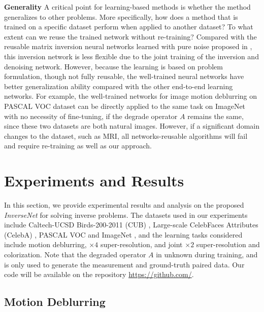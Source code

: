 \documentclass[10pt,twocolumn,letterpaper]{article}
\begin{document}

\textbf{Generality}
A critical point for learning-based methods is whether the method generalizes to other problems. 
More specifically, how does a method that is trained on a specific dataset perform when applied to another dataset? 
To what extent can we reuse the trained network without re-training? Compared with the reusable matrix inversion neural networks learned with pure noise proposed in \cite{sonderby2016amortised, ADMM2017NIPS}, this inversion network is less flexible due to the joint training of the inversion and denoising network. However, because the learning is based on problem formulation, though not fully reusable, the well-trained neural networks have better generalization ability compared with the other end-to-end learning networks.  
For example, the well-trained networks for image motion deblurring on PASCAL VOC dataset \cite{everingham2010pascal} 
can be directly applied to the same task on ImageNet \cite{deng2009imagenet} with no necessity of fine-tuning, if the degrade operator $A$ remains the same, since these two datasets are both natural images. However, if a significant domain changes to the dataset, such as MRI, all networks-reusable algorithms will fail and require re-training as well as our approach. 

\section{Experiments and Results}

In this section, we provide experimental results and analysis on the proposed \emph{InverseNet} for solving inverse problems. 
The datasets used in our experiments include Caltech-UCSD Birds-200-2011 (CUB) \cite{wah2011caltech},
Large-scale CelebFaces Attributes (CelebA) \cite{liu2015deep}, PASCAL VOC and ImageNet \cite{krizhevsky2012imagenet},
and the learning tasks considered include motion deblurring, $\times4$ super-resolution, and joint $\times2$ super-resolution and colorization. Note that the degraded operator $A$ in unknown during training, and is only used to generate the measurement and ground-truth paired data. Our code will be available on the repository \url{https://github.com/}.

\subsection{Motion Deblurring}
\end{document}
